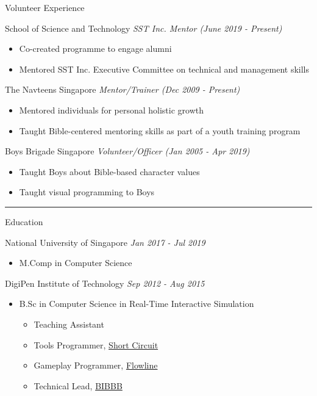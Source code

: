 \documentclass[letterpaper,11pt]{article}
\newcommand{\cvtitle}[1]{\huge\raggedright \textcolor{section_color}{#1}\\}
\newcommand{\cvhead}[1]{\large\raggedright \textcolor{subsection_color}{#1}\\}
\newcommand{\cvlist}[1]{\vspace{-12pt}\small \textcolor{item_color}{\begin{itemize}#1\end{itemize}}}
\newcommand{\cvli}[1]{\vspace{-4pt} \item{#1}}
\newcommand{\cvline}[0]{\noindent\rule{19cm}{0.4pt}}
\newcommand{\link}[2]{\textcolor{link_color}{\href{#1}{#2}}}
\newcommand{\qualifier}[1]{\hfill \textsl{\footnotesize #1}}
\begin{document}
\cvtitle{Volunteer Experience}

\cvhead{School of Science and Technology \qualifier{SST Inc. Mentor (June 2019 - Present)}}
\cvlist{
    \cvli{Co-created programme to engage alumni}
    \cvli{Mentored SST Inc. Executive Committee on technical and management skills}
}

\cvhead{The Navteens Singapore \qualifier{Mentor/Trainer (Dec 2009 - Present)}}
\cvlist{
    \cvli{Mentored individuals for personal holistic growth}
    \cvli{Taught Bible-centered mentoring skills as part of a youth training program}
}

\cvhead{Boys Brigade Singapore \qualifier{Volunteer/Officer (Jan 2005 - Apr 2019)}}
\cvlist{
    \cvli{Taught Boys about Bible-based character values}
    \cvli{Taught visual programming to Boys}
}

\vspace{-12pt}

\cvline

\cvtitle{Education}
\cvhead{National University of Singapore \qualifier{Jan 2017 - Jul 2019}}
\cvlist{
    \cvli{
        \cvhead{M.Comp in Computer Science}
    }
}

\cvhead{DigiPen Institute of Technology \qualifier{Sep 2012 - Aug 2015}}
\cvlist{
    \cvli{
        \cvhead{B.Sc in Computer Science in Real-Time Interactive Simulation}
        \cvlist{
            \cvli{Teaching Assistant}
            \cvli{Tools Programmer, \link{http://games.digipen.edu/games/shortcircuit}{Short Circuit}}
            \cvli{Gameplay Programmer, \link{http://games.digipen.edu/games/flowline}{Flowline}}
            \cvli{Technical Lead, \link{http://games.digipen.edu/games/bibbb}{BIBBB}}
        }
    }
}
\end{document}
